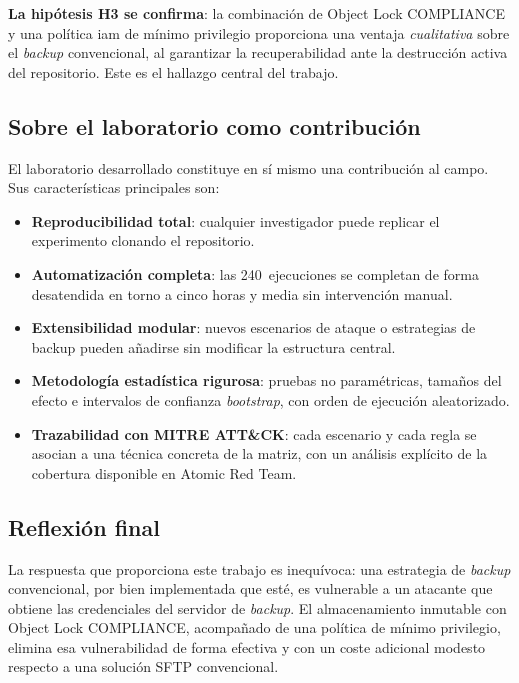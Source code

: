 \documentclass[../main.tex]{subfiles}
\begin{document}
\textbf{La hipótesis H3 se confirma}: la combinación de Object Lock COMPLIANCE y una
política \gls{iam} de mínimo privilegio proporciona una ventaja \emph{cualitativa}
sobre el \emph{backup} convencional, al garantizar la recuperabilidad ante la
destrucción activa del repositorio. Este es el hallazgo central del trabajo.

\subsection{Sobre el laboratorio como contribución}

El laboratorio desarrollado constituye en sí mismo una contribución al campo. Sus
características principales son:

\begin{itemize}
  \item \textbf{Reproducibilidad total}: cualquier investigador puede replicar el
  experimento clonando el repositorio.
  \item \textbf{Automatización completa}: las 240~ejecuciones se completan de forma
  desatendida en torno a cinco horas y media sin intervención manual.
  \item \textbf{Extensibilidad modular}: nuevos escenarios de ataque o estrategias
  de backup pueden añadirse sin modificar la estructura central.
  \item \textbf{Metodología estadística rigurosa}: pruebas no paramétricas,
  tamaños del efecto e intervalos de confianza \emph{bootstrap}, con orden de
  ejecución aleatorizado.
  \item \textbf{Trazabilidad con MITRE ATT\&CK}: cada escenario y cada regla se
  asocian a una técnica concreta de la matriz, con un análisis explícito de la
  cobertura disponible en Atomic Red Team.
\end{itemize}

\subsection{Reflexión final}

La respuesta que proporciona este trabajo es inequívoca: una estrategia de
\emph{backup} convencional, por bien implementada que esté, es vulnerable a un
atacante que obtiene las credenciales del servidor de \emph{backup}. El
almacenamiento inmutable con Object Lock COMPLIANCE, acompañado de una política de
mínimo privilegio, elimina esa vulnerabilidad de forma efectiva y con un coste
adicional modesto respecto a una solución SFTP convencional.
\end{document}
